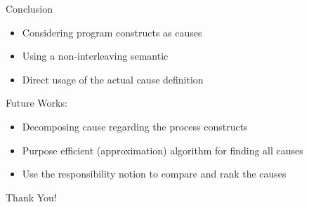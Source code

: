 \begin{frame}{Conclusion}
    \begin{itemize}
        \item Considering program constructs as causes
        \item Using a non-interleaving semantic 
        \item Direct usage of the actual cause definition
    \end{itemize}

    \vspace{\baselineskip}
    Future Works:
    \begin{itemize}
        \item Decomposing cause regarding the process constructs
        \item Purpose efficient (approximation) algorithm for finding 
        all causes
        \item Use the responsibility notion to compare and 
        rank the causes
    \end{itemize}
\end{frame}

\begin{frame}
    \begin{center}
        \Huge{Thank You!}
    \end{center}
\end{frame}